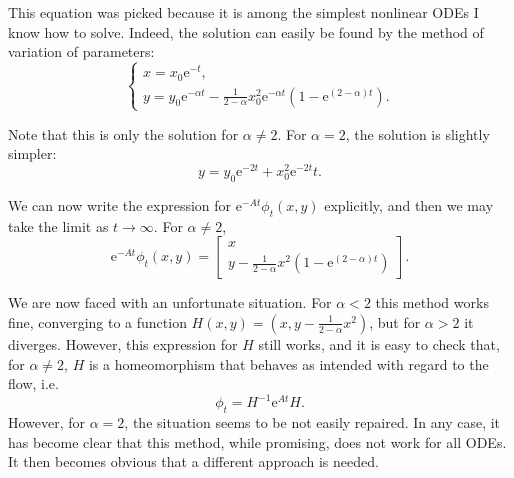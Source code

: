 \documentclass{article}
\newcommand{\e}{\mathrm{e}}
\begin{document}
This equation was picked because it is among the simplest nonlinear ODEs I know how to solve. Indeed, the solution can easily be found by the method of variation of parameters:
\[
\begin{cases}
x = x_0 \e^{-t},\\
y = y_0 \e^{-\alpha t} - \frac1{2-\alpha} x_0^2 \e^{-\alpha t} (1 - \e^{(2 - \alpha)t}).
\end{cases}
\]

Note that this is only the solution for $\alpha \neq 2$. For $\alpha = 2$, the solution is slightly simpler:
\[y = y_0 \e^{-2 t} + x_0^2 \e^{- 2 t} t.\]

We can now write the expression for $\e^{-At} \phi_t (x,y)$ explicitly, and then we may take the limit as $t \to \infty$. For $\alpha \neq 2$,
\begin{equation}\label{flowsimple}
\e^{-At} \phi_t (x,y) =
\begin{bmatrix}
x\\
y - \frac1{2-\alpha} x^2 (1 - \e^{(2-\alpha)t})
\end{bmatrix}.
\end{equation}

We are now faced with an unfortunate situation. For $\alpha < 2$ this method works fine, converging to a function $H(x,y) = (x, y-\frac1{2-\alpha} x^2)$, but for $\alpha > 2$ it diverges. However, this expression for $H$ still works, and it is easy to check that, for $\alpha \neq 2$, $H$ is a homeomorphism that behaves as intended with regard to the flow, i.e.
\[\phi_t = H^{-1} \e^{A t} H.\]
However, for $\alpha = 2$, the situation seems to be not easily repaired. In any case, it has become clear that this method, while promising, does not work for all ODEs. It then becomes obvious that a different approach is needed.
\end{document}
